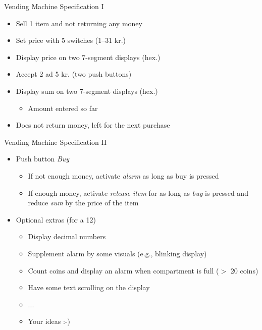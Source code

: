 \begin{frame}[fragile]{Vending Machine Specification I}
\begin{itemize}
\item Sell 1 item and not returning any money
\item Set price with 5 switches (1--31 kr.)
\item Display price on two 7-segment displays (hex.)
\item Accept 2 ad 5 kr. (two push buttons)
\item Display sum on two 7-segment displays (hex.)
\begin{itemize}
\item Amount entered so far
\end{itemize}
\item Does not return money, left for the next purchase
\end{itemize}
\end{frame}

\begin{frame}[fragile]{Vending Machine Specification II}
\begin{itemize}
\item Push button \emph{Buy}
\begin{itemize}
\item If not enough money, activate \emph{alarm} as long as buy is pressed
\item If enough money, activate \emph{release item} for as long as \emph{buy}
is pressed and reduce \emph{sum} by the price of the item
\end{itemize}
\item Optional extras (for a 12)
\begin{itemize}
\item Display decimal numbers
\item Supplement alarm by some visuals (e.g., blinking display)
\item Count coins and display an alarm when compartment is full ($>$ 20 coins)
\item Have some text scrolling on the display
\item ...
\item Your ideas :-)
\end{itemize}
\end{itemize}
\end{frame}

